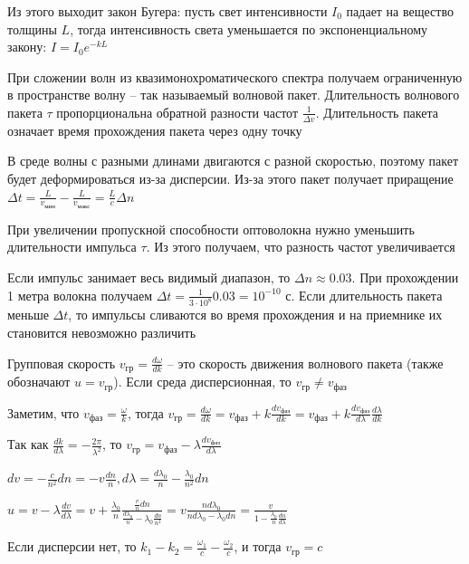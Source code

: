 \documentclass[12pt]{article}
\begin{document}
Из этого выходит закон Бугера: пусть свет интенсивности $I_0$ падает на вещество толщины $L$, тогда интенсивность света уменьшается по экспоненциальному закону: $I = I_0 e^{- k L}$

При сложении волн из квазимонохроматического спектра получаем ограниченную в пространстве волну -- так называемый волновой пакет. Длительность волнового пакета $\tau$ пропорциональна обратной разности частот $\frac{1}{\Delta v}$. Длительность пакета означает время прохождения пакета через одну точку

В среде волны с разными длинами двигаются с разной скоростью, поэтому пакет будет деформироваться из-за дисперсии. Из-за этого пакет получает приращение $\Delta t = \frac{L}{v_{\text{мин}}} - \frac{L}{v_{\text{макс}}} = \frac{L}{c} \Delta n$

При увеличении пропускной способности оптоволокна нужно уменьшить длительности импульса $\tau$. Из этого получаем, что разность частот увеличивается

Если импульс занимает весь видимый диапазон, то $\Delta n \approx 0.03$. При прохождении 1 метра волокна получаем $\Delta t = \frac{1}{3 \cdot 10^8} 0.03 = 10^{-10}$ с. Если длительность пакета меньше $\Delta t$, то импульсы сливаются во время прохождения и на приемнике их становится невозможно различить 

Групповая скорость $v_{\text{гр}} = \frac{d\omega}{dk}$ -- это скорость движения волнового пакета (также обозначают $u = v_\text{гр}$). Если среда дисперсионная, то $v_{\text{гр}} \neq v_{\text{фаз}}$

Заметим, что $v_{\text{фаз}} = \frac{\omega}{k}$, тогда $v_{\text{гр}} = \frac{d\omega}{dk} = v_{\text{фаз}} + k \frac{d v_{\text{фаз}}}{dk} = v_{\text{фаз}} + k \frac{d v_{\text{фаз}}}{d\lambda} \frac{d\lambda}{dk}$

Так как $\frac{dk}{d\lambda} = -\frac{2\pi}{\lambda^2}$, то $v_{\text{гр}} = v_{\text{фаз}} - \lambda \frac{d v_{\text{фаз}}}{d\lambda}$

$dv = - \frac{c}{n^2} dn = -v \frac{dn}{n}, d\lambda = \frac{d \lambda_0}{n} - \frac{\lambda_0}{n^2} dn$

$u = v - \lambda \frac{dv}{d\lambda} = v + \frac{\lambda_0}{n} \frac{\frac{v}{n} dn}{\frac{d \lambda_0}{n} - \lambda_0 \frac{dn}{n^2}} = v \frac{n d\lambda_0}{n d\lambda_0 - \lambda_0 dn} = \frac{v}{1 - \frac{\lambda_0}{n} \frac{dn}{d\lambda}}$

Если дисперсии нет, то $k_1 - k_2 = \frac{\omega_1}{c} - \frac{\omega_2}{c}$, и тогда $v_{\text{гр}} = c$
\end{document}
